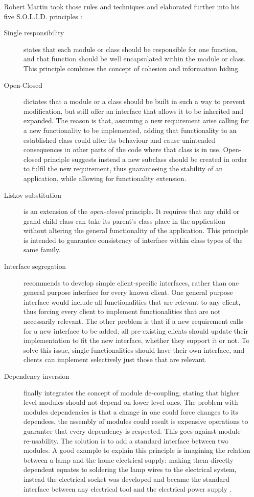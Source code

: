 Robert Martin took those rules and techniques and elaborated further into his
five S.O.L.I.D. principles \cite{RM03}:
\begin{description}
\item [Single responsibility] states that each module or class should be
responsible for one function, and that function should be well encapsulated
within the module or class. This principle combines the concept of cohesion and
information hiding.
\item [Open-Closed] dictates that a module or a class should be built in such a
way to prevent modification, but still offer an interface that allows it to be
inherited and expanded. The reason is that, assuming a new requirement arise
calling for a new functionality to be implemented, adding that functionality
to an established class could alter its behaviour and cause unintended
consequences in other parts of the code where that class is in use. Open-closed
principle suggests instead a new subclass should be created in order
to fulfil the new requirement, thus guaranteeing the stability of an
application, while allowing for functionality extension.
\item [Liskov substitution] is an extension of the \emph{open-closed} principle.
It requires that any child or grand-child class can take its parent's class
place in the application without altering the general functionality of the
application. This principle is intended to guarantee consistency of interface
within class types of the same family.
\item [Interface segregation] recommends to develop simple
client-specific interfaces, rather than one general purpose interface for every
known client. One general purpose interface would include all functionalities
that are relevant to any client, thus forcing every client to implement
functionalities that are not necessarily relevant. The other problem is that if
a new requirement calls for a new interface to be added, all pre-existing
clients should update their implementation to fit the new interface, whether
they support it or not. To solve this issue, single functionalities should have
their own interface, and clients can implement selectively just those that are
relevant.
\item [Dependency inversion] finally integrates the concept of module
de-coupling, stating that higher level modules should not depend on lower level
ones. The problem with modules dependencies is that a change in one could force
changes to its dependees, the assembly of modules could result is expensive
operations to guarantee that every dependency is respected. This goes against
module re-usability. The solution is to add a standard interface between two
modules. A good example to explain this principle is imagining the relation
between a lamp and the home electrical supply: making them directly dependent
equates to soldering the lamp wires to the electrical system, instead the
electrical socket was developed and became the standard interface between any
electrical tool and the electrical power supply \cite{RP05}.
\end{description}

